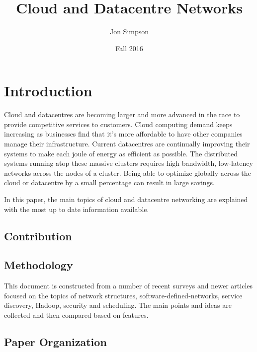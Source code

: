 \documentclass[fullapage,12pt]{article}
\title{Cloud and Datacentre Networks}
\author{Jon Simpson}
\date{Fall 2016}
\begin{document}
\begin{titlepage}
\maketitle
\end{titlepage}

\section{Introduction} \label{sec:introduction}

Cloud and datacentres are becoming larger and more advanced in the race to provide competitive services to customers. Cloud computing demand keeps increasing as businesses find that it's more affordable to have other companies manage their infrastructure. Current datacentres are continually improving their systems to make each joule of energy as efficient as possible. The distributed systems running atop these massive clusters requires high bandwidth, low-latency networks across the nodes of a cluster. Being able to optimize globally across the cloud or datacentre by a small percentage can result in large savings.

In this paper, the main topics of cloud and datacentre networking are explained with the most up to date information available.



\subsection{Contribution} \label{sub:contribution}

\subsection{Methodology} \label{sub:methodology}

This document is constructed from a number of recent surveys and newer articles focused on the topics of network structures, software-defined-networks, service discovery, Hadoop, security and scheduling. The main points and ideas are collected and then compared based on features.

\subsection{Paper Organization} \label{sub:organization}

\end{document}
